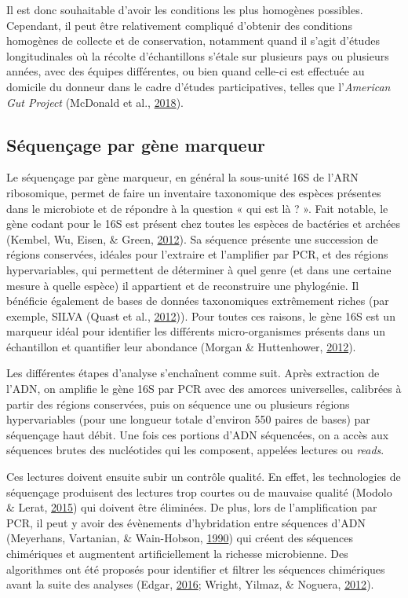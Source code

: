 \documentclass[12pt,a4paper]{reedthesis}
\theoremstyle{definition}
\theoremstyle{definition}
\theoremstyle{definition}
\theoremstyle{remark}
\begin{document}
Il est donc souhaitable d'avoir les conditions les plus homogènes possibles. Cependant, il peut être relativement compliqué d'obtenir des conditions homogènes de collecte et de conservation, notamment quand il s'agit d'études longitudinales où la récolte d'échantillons s'étale sur plusieurs pays ou plusieurs années, avec des équipes différentes, ou bien quand celle-ci est effectuée au domicile du donneur dans le cadre d'études participatives, telles que l'\emph{American Gut Project} (McDonald et al., \protect\hyperlink{ref-mcdonald2018american}{2018}).

\hypertarget{suxe9quenuxe7age-par-guxe8ne-marqueur}{%
\subsection{Séquençage par gène marqueur}\label{suxe9quenuxe7age-par-guxe8ne-marqueur}}

Le séquençage par gène marqueur, en général la sous-unité 16S de l'ARN ribosomique, permet de faire un inventaire taxonomique des espèces présentes dans le microbiote et de répondre à la question « qui est là ? ». Fait notable, le gène codant pour le 16S est présent chez toutes les espèces de bactéries et archées (Kembel, Wu, Eisen, \& Green, \protect\hyperlink{ref-kembel2012incorporating}{2012}). Sa séquence présente une succession de régions conservées, idéales pour l'extraire et l'amplifier par PCR, et des régions hypervariables, qui permettent de déterminer à quel genre (et dans une certaine mesure à quelle espèce) il appartient et de reconstruire une phylogénie. Il bénéficie également de bases de données taxonomiques extrêmement riches (par exemple, SILVA (Quast et al., \protect\hyperlink{ref-quast2012silva}{2012})). Pour toutes ces raisons, le gène 16S est un marqueur idéal pour identifier les différents micro-organismes présents dans un échantillon et quantifier leur abondance (Morgan \& Huttenhower, \protect\hyperlink{ref-morgan2012human}{2012}).

Les différentes étapes d'analyse s'enchaînent comme suit. Après extraction de l'ADN, on amplifie le gène 16S par PCR avec des amorces universelles, calibrées à partir des régions conservées, puis on séquence une ou plusieurs régions hypervariables (pour une longueur totale d'environ 550 paires de bases) par séquençage haut débit. Une fois ces portions d'ADN séquencées, on a accès aux séquences brutes des nucléotides qui les composent, appelées lectures ou \emph{reads}.

Ces lectures doivent ensuite subir un contrôle qualité. En effet, les technologies de séquençage produisent des lectures trop courtes ou de mauvaise qualité (Modolo \& Lerat, \protect\hyperlink{ref-modolo2015urqt}{2015}) qui doivent être éliminées. De plus, lors de l'amplification par PCR, il peut y avoir des évènements d'hybridation entre séquences d'ADN (Meyerhans, Vartanian, \& Wain-Hobson, \protect\hyperlink{ref-meyerhans1990dna}{1990}) qui créent des séquences chimériques et augmentent artificiellement la richesse microbienne. Des algorithmes ont été proposés pour identifier et filtrer les séquences chimériques avant la suite des analyses (Edgar, \protect\hyperlink{ref-edgar2016uchime2}{2016}; Wright, Yilmaz, \& Noguera, \protect\hyperlink{ref-wright2012decipher}{2012}).
\end{document}
